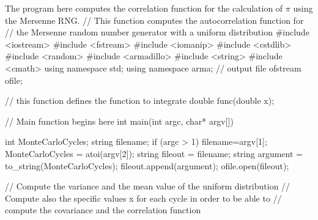 \documentclass[%
oneside,                 %
final,                   %
10pt]{article}
\newenvironment{block_mdfboxadmon}[1][]{
\begin{block_mdfboxmdframed}[frametitle=#1]
}
{
\end{block_mdfboxmdframed}
}
\begin{document}
\begin{block_mdfboxadmon}[]
The program here computes the correlation function for the calculation of $\pi$ using the Mersenne RNG. 
\bcppcod
//  This function computes the autocorrelation function for 
//  the Mersenne random number generator with a uniform distribution
#include <iostream>
#include <fstream>
#include <iomanip>
#include <cstdlib>
#include <random>
#include <armadillo>
#include <string>
#include <cmath>
using namespace  std;
using namespace arma;
// output file
ofstream ofile;

//     this function defines the function to integrate  
double func(double x);

//     Main function begins here     
int main(int argc, char* argv[])
{
  int MonteCarloCycles;
  string filename;
  if (argc > 1) {
    filename=argv[1];
    MonteCarloCycles = atoi(argv[2]);
    string fileout = filename;
    string argument = to_string(MonteCarloCycles);
    fileout.append(argument);
    ofile.open(fileout);
  }

  // Compute the variance and the mean value of the uniform distribution
  // Compute also the specific values x for each cycle in order to be able to
  // compute the covariance and the correlation function  

}
\end{block_mdfboxadmon}
\end{document}
